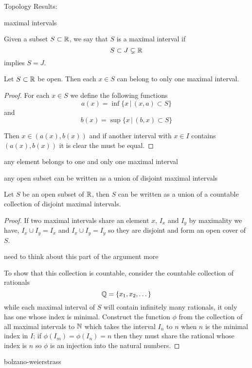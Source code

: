\begin{chapter}{Topology}
    Results:

    maximal intervals 
    
    \begin{defn}
        Given a subset $S \subset \mathbb{R}$, we say that $S$ is a maximal interval if 
        \[S \subset J \subsetneq \mathbb{R}\]
        implies $S = J$. 
    \end{defn}

    
    \begin{thm}
        Let $S \subset \mathbb{R}$ be open. Then each $x \in S$ can belong to only one maximal interval.
    \end{thm}

    
    \begin{proof}
        For each $x \in S$ we define the following functions 
        \[a(x) = \inf\{x \, | \, (x, a) \subset S\}\]
        and 
        \[b(x) = \sup\{x \, | \, (b, x) \subset S\}\]

        Then $x \in (a(x), b(x))$ and if another interval with $x \in I$ contains $(a(x), b(x))$ it is clear the must be equal. 
    \end{proof}


    any element belongs to one and only one maximal interval


    
    any open subset can be written as a union of disjoint maximal intervals 

    
    \begin{thm}
        Let $S$ be an open subset of $\mathbb{R}$, then $S$ can be written as a union of a countable collection of disjoint maximal intervals. 
    \end{thm}

    
    \begin{proof}
        If two maximal intervals share an element $x$, $I_x$ and $I_y$ by maximality we have, $I_x \cup I_y = I_x$ and 
        $I_x \cup I_y = I_y$ so they are disjoint and form an open cover of $S$. 

        need to think about this part of the argument more

        To show that this collection is countable, consider the countable collection of rationals 
        \[\mathbb{Q} = \{x_1, x_2, \dots\}\]
        while each maximal interval of $S$ will contain infinitely many rationals, it only has one whose index is minimal. Construct the function $\phi$ from the collection of all maximal
        intervals to $\mathbb{N}$ which takes the interval $I_n$ to $n$ when $n$ is the minimal index in $I$; if $\phi(I_m) = \phi(I_n) = n$ then they must share the rational whose index is $n$ so 
        $\phi$ is an injection into the natural numbers.   
    \end{proof}
    bolzano-weierstrass 


\end{chapter}
